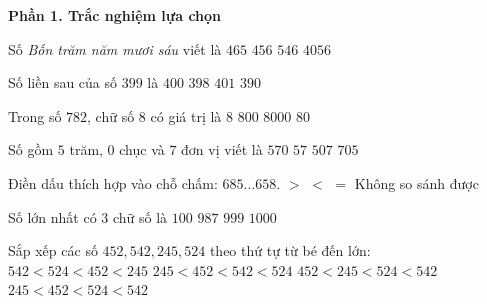 \textbf{Phần 1. Trắc nghiệm lựa chọn}

\begin{ex} %
Số \textit{Bốn trăm năm mươi sáu} viết là
\choice
{$465$}
{\True $456$}
{$546$}
{$4056$}
\end{ex}

\begin{ex} %
Số liền sau của số $399$ là
\choice
{\True $400$}
{$398$}
{$401$}
{$390$}
\end{ex}

\begin{ex} %
Trong số $782$, chữ số 8 có giá trị là
\choice
{$8$}
{$800$}
{$8000$}
{\True $80$}
\end{ex}

\begin{ex} %
Số gồm $5$ trăm, $0$ chục và $7$ đơn vị viết là
\choice
{$570$}
{$57$}
{\True $507$}
{$705$}
\end{ex}

\begin{ex} %
Điền dấu thích hợp vào chỗ chấm: $685 \dots 658$.
\choice
{\True $>$}
{$<$}
{$=$}
{Không so sánh được}
\end{ex}

\begin{ex} %
Số lớn nhất có 3 chữ số là
\choice
{$100$}
{$987$}
{\True $999$}
{$1000$}
\end{ex}

\begin{ex} %
Sắp xếp các số $452, 542, 245, 524$ theo thứ tự từ bé đến lớn:
\choice
{$542 < 524 < 452 < 245$}
{$245 < 452 < 542 < 524$}
{$452 < 245 < 524 < 542$}
{\True $245 < 452 < 524 < 542$}
\end{ex}

